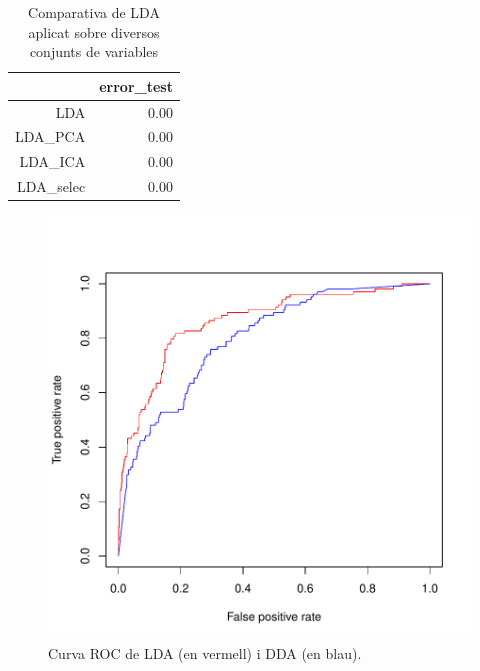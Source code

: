 \documentclass[a4paper,10pt]{article}
\begin{document}
\begin{table}[ht]
\begin{center}
\begin{tabular}{rr}
  \hline
 & error\_test \\ 
  \hline
LDA & 0.00 \\ 
  LDA\_PCA & 0.00 \\ 
  LDA\_ICA & 0.00 \\ 
  LDA\_selec & 0.00 \\ 
   \hline
\end{tabular}
\caption{Comparativa de LDA aplicat sobre diversos conjunts de variables}
\label{tab:error_da2}
\end{center}
\end{table}

\begin{center}
\begin{figure}
\includegraphics[width=5in]{memoria-da_roc}
\caption{Curva ROC de LDA (en vermell) i DDA (en blau).} \label{fig:da_roc}
\end{figure}
\end{center}
\end{document}
